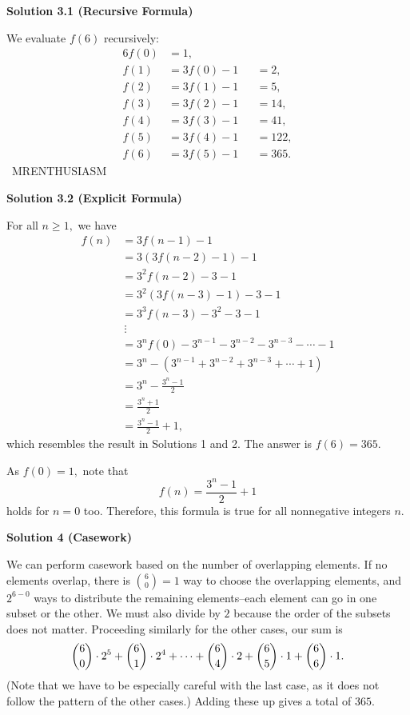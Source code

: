 \begin{enumerate}
 



\textbf{Solution 3.1 (Recursive Formula)}

We evaluate $f(6)$ recursively:
 \begin{alignat*}{6} f(0)&=1, \\ f(1)&=3f(0)-1&&=2, \\ f(2)&=3f(1)-1&&=5, \\ f(3)&=3f(2)-1&&=14, \\ f(4)&=3f(3)-1&&=41, \\ f(5)&=3f(4)-1&&=122, \\ f(6)&=3f(5)-1&&=\boxed{365}. \end{alignat*}~MRENTHUSIASM

 



\textbf{Solution 3.2 (Explicit Formula)}

For all $n\geq1,$ we have
 \begin{align*} f(n) &= 3f(n-1)-1 \\ &= 3\left(3f(n-2)-1\right)-1 \\ &= 3^2f(n-2)-3-1 \\ &= 3^2\left(3f(n-3)-1\right)-3-1 \\ &= 3^3f(n-3)-3^2-3-1 \\ & \ \vdots \\ &= 3^nf(0)-3^{n-1}-3^{n-2}-3^{n-3}-\cdots-1 \\ &= 3^n-\left(3^{n-1}+3^{n-2}+3^{n-3}+\cdots+1\right) \\ &= 3^n-\frac{3^n-1}{2} \\ &= \frac{3^n+1}{2} \\ &= \frac{3^n-1}{2}+1, \end{align*}
which resembles the result in Solutions 1 and 2. The answer is $f(6)=\boxed{365}.$

 As $f(0)=1,$ note that 
 \[f(n)=\frac{3^n-1}{2}+1\] holds for $n=0$ too. Therefore, this formula is true for all nonnegative integers $n.$




\textbf{Solution 4 (Casework)}

We can perform casework based on the number of overlapping elements. If no elements overlap, there is $\binom60=1$ way to choose the overlapping elements, and $2^{6-0}$ ways to distribute the remaining elements--each element can go in one subset or the other. We must also divide by $2$ because the order of the subsets does not matter. Proceeding similarly for the other cases, our sum is 
 \[\dbinom{6}0 \cdot 2^5+\dbinom{6}1 \cdot 2^4+\cdots +\dbinom{6}4 \cdot 2+\dbinom{6}5 \cdot 1+\dbinom{6}6 \cdot 1.\](Note that we have to be especially careful with the last case, as it does not follow the pattern of the other cases.) Adding these up gives a total of $\boxed{365}.$





\end{enumerate}
